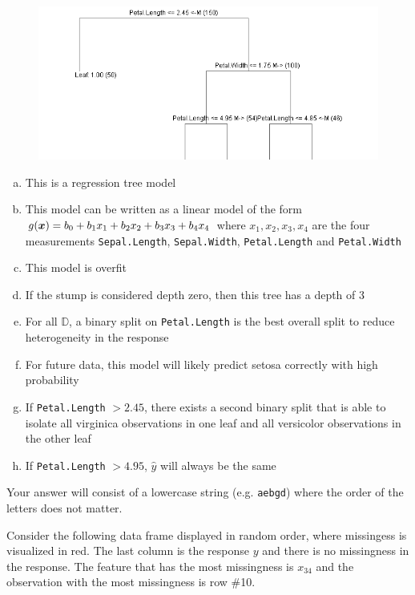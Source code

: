 \documentclass[12pt,landscape]{article}
\newcommand{\instr}{\small Your answer will consist of a lowercase string (e.g. \texttt{aebgd}) where the order of the letters does not matter. \normalsize}
\begin{document}
\vspace{-0.2cm}
\begin{figure}[htp]
\centering
\includegraphics[width=5.3in]{classification_tree.png}
\end{figure}
\vspace{-0.3cm}
\vspace{-0.2cm}\benum{}
\vspace{-0.2cm}
\begin{enumerate}[(a)]
\item This is a regression tree model
\item This model can be written as a linear model of the form $g(\boldsymbol{x}) = b_0 + b_1 x_1 + b_2 x_2 + b_3 x_3 + b_4 x_4$ where $x_1, x_2, x_3, x_4$ are the four measurements \texttt{Sepal.Length}, \texttt{Sepal.Width}, \texttt{Petal.Length} and \texttt{Petal.Width}
\item This model is overfit
\item If the stump is considered depth zero, then this tree has a depth of 3
\item For all $\mathbb{D}$, a binary split on \texttt{Petal.Length} is the best overall split to reduce heterogeneity in the response
\item For future data, this model will likely predict setosa correctly with high probability
\item If \texttt{Petal.Length} $> 2.45$, there exists a second binary split that is able to isolate all virginica observations in one leaf and all versicolor observations in the other leaf
\item If \texttt{Petal.Length} $> 4.95$, $\hat{y}$ will always be the same
\end{enumerate}
\eenum\instr\pagebreak


\problem{} Consider the following data frame displayed in random order, where missingess is visualized in red. The last column is the response $y$ and there is no missingness in the response. The feature that has the most missingness is $x_{34}$ and the observation with the most missingness is row \#10.
\end{document}
